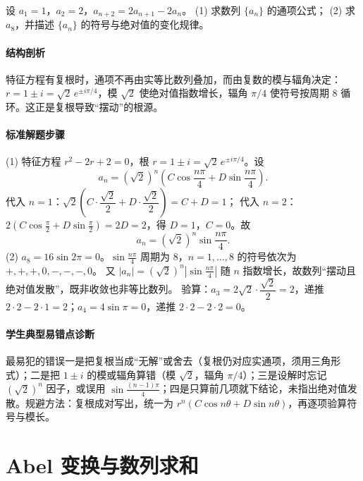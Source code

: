 \begin{problem}
设 $a_1=1$，$a_2=2$，$a_{n+2}=2a_{n+1}-2a_n$。
(1) 求数列 $\{a_n\}$ 的通项公式；
(2) 求 $a_8$，并描述 $\{a_n\}$ 的符号与绝对值的变化规律。
\end{problem}
\begin{solution}
\paragraph{结构剖析}
特征方程有复根时，通项不再由实等比数列叠加，而由复数的模与辐角决定：$r=1\pm i=\sqrt2\,e^{\pm i\pi/4}$，模 $\sqrt2$ 使绝对值指数增长，辐角 $\pi/4$ 使符号按周期 $8$ 循环。这正是复根导致“摆动”的根源。
\paragraph{标准解题步骤}
(1) 特征方程 $r^2-2r+2=0$，根 $r=1\pm i=\sqrt2\,e^{\pm i\pi/4}$。设
$$a_n=(\sqrt2)^n\left(C\cos\frac{n\pi}4+D\sin\frac{n\pi}4\right).$$
代入 $n=1$：$\sqrt2\left(C\cdot\dfrac{\sqrt2}2+D\cdot\dfrac{\sqrt2}2\right)=C+D=1$；
代入 $n=2$：$2(C\cos\frac\pi2+D\sin\frac\pi2)=2D=2$，得 $D=1$，$C=0$。故
$$a_n=(\sqrt2)^n\sin\frac{n\pi}4.$$
(2) $a_8=16\sin2\pi=0$。$\sin\frac{n\pi}4$ 周期为 $8$，$n=1,\dots,8$ 的符号依次为 $+,+,+,0,-,-,-,0$。
又 $|a_n|=(\sqrt2)^n\left|\sin\frac{n\pi}4\right|$ 随 $n$ 指数增长，故数列“摆动且绝对值发散”，既非收敛也非等比数列。
验算：$a_3=2\sqrt2\cdot\dfrac{\sqrt2}2=2$，递推 $2\cdot2-2\cdot1=2$；$a_4=4\sin\pi=0$，递推 $2\cdot2-2\cdot2=0$。
\paragraph{学生典型易错点诊断}
最易犯的错误一是把复根当成“无解”或舍去（复根仍对应实通项，须用三角形式）；二是把 $1\pm i$ 的模或辐角算错（模 $\sqrt2$，辐角 $\pi/4$）；三是设解时忘记 $(\sqrt2)^n$ 因子，或误用 $\sin\frac{(n-1)\pi}4$；四是只算前几项就下结论，未指出绝对值发散。规避方法：复根成对写出，统一为 $r^n(C\cos n\theta+D\sin n\theta)$，再逐项验算符号与模长。
\end{solution}

\section{Abel 变换与数列求和}

